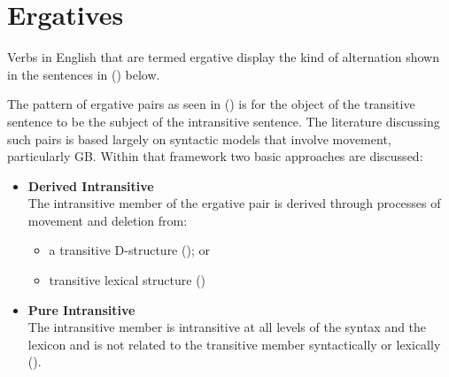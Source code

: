 \chapter{Ergatives}
\label{ergatives}

Verbs in English that are termed ergative display the kind of
alternation shown in the sentences in () below.


The pattern of ergative pairs as seen in () is for the object of the
transitive sentence to be the subject of the intransitive sentence.
The literature discussing such pairs is based largely on syntactic
models that involve movement, particularly GB.  Within that framework
two basic approaches are discussed:

\begin{itemize}
\item {\bf Derived Intransitive}\\ The intransitive member of the
ergative pair is derived through processes of movement and deletion from:
\begin{itemize}
\item a transitive D-structure (\cite{Burzio86}); or	
\item transitive lexical structure (\cite{HaleKeyser86,HaleKeyser87})
\end{itemize}

\item {\bf Pure Intransitive}\\ The intransitive member is intransitive at all levels of the
syntax and the lexicon and is not related to the transitive member
syntactically or lexically (\cite{Napoli88}).
\end{itemize}


